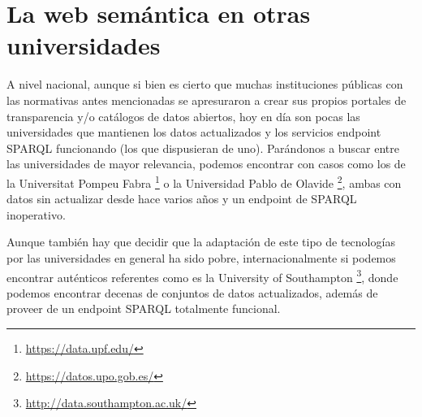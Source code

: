 \newpage
\section{La web semántica en otras universidades}

A nivel nacional, aunque si bien es cierto que muchas instituciones públicas con las normativas antes mencionadas se apresuraron a crear sus propios portales de transparencia y/o catálogos de datos abiertos, hoy en día son pocas las universidades que mantienen los datos actualizados y los servicios endpoint {\sf SPARQL} funcionando (los que dispusieran de uno). Parándonos a buscar entre las universidades de mayor relevancia, podemos encontrar con casos como los de la {\sf Universitat Pompeu Fabra} \footnote{\url{https://data.upf.edu/}} o la {\sf Universidad Pablo de Olavide} \footnote{\url{https://datos.upo.gob.es/}}, ambas con datos sin actualizar desde hace varios años y un endpoint de {\sf SPARQL} inoperativo.

\bigskip
Aunque también hay que decidir que la adaptación de este tipo de tecnologías por las universidades en general ha sido pobre, internacionalmente si podemos encontrar auténticos referentes como es la {\sf University of Southampton} \footnote{\url{http://data.southampton.ac.uk/}}, donde podemos encontrar decenas de conjuntos de datos actualizados, además de proveer de un endpoint {\sf SPARQL} totalmente funcional.